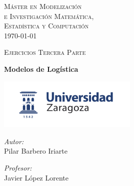 \documentclass[a4paper,12pt]{article}
\author{Pilar Barbero Iriarte}
\begin{document}
\begin{titlepage}
\begin{center}



\textsc{\LARGE M\'aster en Modelizaci\'on \\e Investigaci\'on Matem\'atica,\\ Estad\'istica y Computaci\'on }\\[1.5cm]
{\large \today}

\textsc{Ejercicios Tercera Parte}\\[0.5cm]

\vfill

{ \huge \bfseries Modelos de Log\'istica \\[0.4cm] }

\vfill


\includegraphics[width=0.5\textwidth]{../logoUZ.png}~\\[1cm]

\noindent
\begin{minipage}{0.4\textwidth}
\begin{flushleft} \large
\emph{Autor:}\\
Pilar Barbero Iriarte 
\end{flushleft}
\end{minipage}%
\begin{minipage}{0.4\textwidth}
\begin{flushright} \large
\emph{Profesor:} \\
Javier L\'opez Lorente
\end{flushright}
\end{minipage}

\end{center}


\end{titlepage}

\pagebreak
\tableofcontents
\pagebreak
\end{document}
